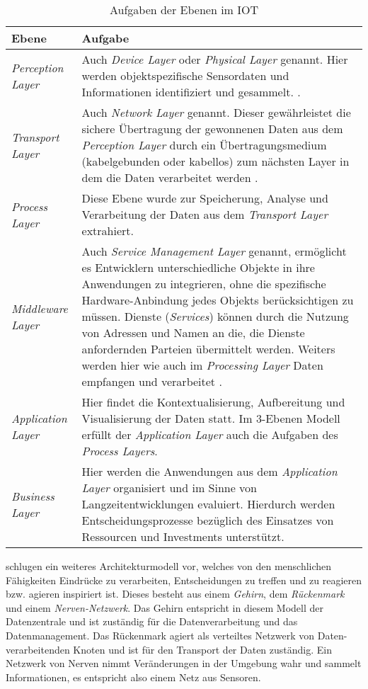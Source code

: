 \documentclass[BMR,Bachelor,ngerman]{twbook}%
\begin{document}
\begin{table}[H]
\caption{Aufgaben der Ebenen im \ac{IOT}}
\label{tab:layers}
\centering
\begin{tabular}{| p{}| p{} |}\hline
\rowcolor[gray]{0.9}Ebene & Aufgabe \\\hline
\emph{Perception Layer} & Auch \emph{Device Layer} oder \emph{Physical Layer} genannt. Hier werden objektspezifische Sensordaten und Informationen identifiziert und gesammelt. \cite{khan2012future}.\\\hline
\emph{Transport Layer} & Auch \emph{Network Layer} genannt. Dieser gewährleistet die sichere Übertragung der gewonnenen Daten aus dem \emph{Perception Layer} durch ein Übertragungsmedium (kabelgebunden oder kabellos) zum nächsten Layer in dem die Daten verarbeitet werden \cite{khan2012future}.\\\hline
%
\emph{Process Layer} & Diese Ebene wurde zur Speicherung, Analyse und Verarbeitung der Daten aus dem \emph{Transport Layer} extrahiert.\\\hline
%
\emph{Middleware Layer} & Auch \emph{Service Management Layer} genannt, ermöglicht es Entwicklern  unterschiedliche Objekte in ihre Anwendungen zu integrieren, ohne die spezifische Hardware-Anbindung jedes Objekts berücksichtigen zu müssen. Dienste (\emph{Services}) können durch die Nutzung von Adressen und Namen an die, die Dienste anfordernden Parteien übermittelt werden. Weiters werden hier wie auch im \emph{Processing Layer} Daten empfangen und verarbeitet \cite{alfuqaha2015survey}.\\\hline
%
\emph{Application Layer} & Hier findet die Kontextualisierung, Aufbereitung und Visualisierung der Daten statt. Im 3-Ebenen Modell erfüllt der \emph{Application Layer} auch die Aufgaben des \emph{Process Layers}.\\\hline
%
\emph{Business Layer} & Hier werden die Anwendungen aus dem \emph{Application Layer} organisiert und im Sinne von Langzeitentwicklungen evaluiert. Hierdurch werden Entscheidungsprozesse bezüglich des Einsatzes von Ressourcen und Investments unterstützt.\\\hline
\end{tabular}
\end{table}
 schlugen ein weiteres Architekturmodell vor, welches von den menschlichen Fähigkeiten Eindrücke zu verarbeiten, Entscheidungen zu treffen und zu reagieren bzw. agieren inspiriert ist. Dieses besteht aus einem \emph{Gehirn}, dem \emph{Rückenmark} und einem \emph{Nerven-Netzwerk}. Das Gehirn entspricht in diesem Modell der Datenzentrale und ist zuständig für die Datenverarbeitung und das Datenmanagement. Das Rückenmark agiert als verteiltes Netzwerk von Daten-verarbeitenden Knoten und ist für den Transport der Daten zuständig. Ein Netzwerk von Nerven nimmt Veränderungen in der Umgebung wahr und sammelt Informationen, es entspricht also einem Netz aus Sensoren.
\end{document}
